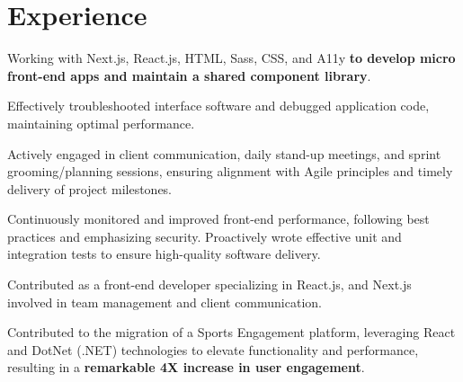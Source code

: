 \documentclass[letterpaper]{deedy-resume} %
\begin{document}
\begin{minipage}[t]{0.66\textwidth} %


\section{Experience}

\vspace{\topsep} %
\begin{tightitemize}
\item Working with Next.js, React.js, HTML, Sass, CSS, and A11y \textbf{to develop micro front-end apps and maintain a shared component library}.
\item Effectively troubleshooted interface software and debugged application code, maintaining optimal performance.
\item Actively engaged in client communication, daily stand-up meetings, and sprint grooming/planning sessions, ensuring alignment with Agile principles and timely delivery of project milestones.
\item Continuously monitored and improved front-end performance, following best practices and emphasizing security. Proactively wrote effective unit and integration tests to ensure high-quality software delivery.

\end{tightitemize}

\sectionspace %


\begin{tightitemize}
\item Contributed as a front-end developer specializing in React.js, and Next.js involved in team management and client communication.
\item  Contributed to the migration of a Sports Engagement platform, leveraging React and DotNet (.NET) technologies to elevate functionality and performance,
resulting in a \textbf{remarkable 4X increase in user engagement}.
\end{tightitemize}


\end{minipage}
\end{document}
